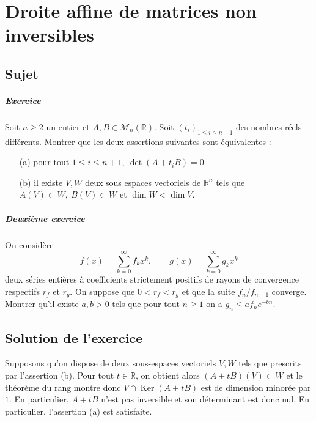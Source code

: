 \chapter{Droite affine de matrices non inversibles}

\section{Sujet}

\paragraph{Exercice}
Soit $n \geqslant 2$ un entier et $A,B \in \mathscr M_n(\mathbb R)$. Soit $(t_i)_{1\leqslant i \leqslant n+1}$ des nombres réels différents. Montrer que les deux assertions suivantes sont équivalentes :
\begin{enumerate}
    \item[(a)] pour tout $1 \leqslant i \leqslant n+1,\ \det(A+t_iB) = 0$
    \item[(b)] il existe $V,W$ deux sous espaces vectoriels de $\mathbb R^n$ tels que $A(V) \subset W,\ B(V) \subset W$ et $\dim W < \dim V$.
\end{enumerate}

\paragraph{Deuxième exercice}
On considère
$$
f(x) = \sum_{k=0}^{\infty} f_k x^k,
\qquad
g(x) = \sum_{k=0}^{\infty} g_k x^k
$$
deux séries entières à coefficients strictement positifs de rayons de convergence respectifs $r_f$ et $r_g$.
On suppose que $0 < r_f < r_g$ et que la suite $f_n/f_{n+1}$ converge.
Montrer qu'il existe $a,b > 0$ tels que pour tout $n \geqslant 1$ on a $g_n \leqslant a f_n e^{-bn}$.

\section{Solution de l'exercice} %

Supposons qu'on dispose de deux sous-espaces vectoriels $V,W$ tels que prescrits par l'assertion (b). Pour tout $t \in \mathbb R$, on obtient alors $(A+tB)(V) \subset W$ et le théorème du rang montre donc $V \cap \operatorname{Ker}(A+tB)$ est de dimension minorée par $1$. En particulier, $A+tB$ n'est pas inversible et son déterminant est donc nul. En particulier, l'assertion (a) est satisfaite.

